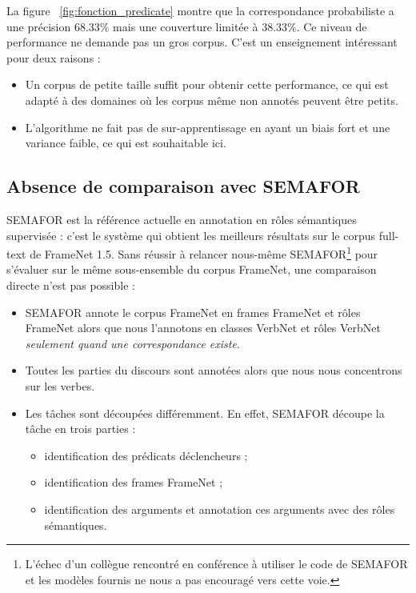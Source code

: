 La figure ~\ref{fig:fonction_predicate} montre que la correspondance
probabiliste a une précision 68.33\% mais une couverture limitée à 38.33\%. Ce
niveau de performance ne demande pas un gros corpus. C'est un enseignement
intéressant pour deux raisons :

\begin{itemize}

    \item Un corpus de petite taille suffit pour obtenir cette performance, ce
    qui est adapté à des domaines où les corpus même non annotés peuvent être
    petits.

    \item L'algorithme ne fait pas de sur-apprentissage en ayant un biais fort
    et une variance faible, ce qui est souhaitable ici.

\end{itemize}

\fi

\subsection{Absence de comparaison avec SEMAFOR}

SEMAFOR \citep{das2014frame} est la référence actuelle en annotation en rôles
sémantiques supervisée : c'est le système qui obtient les meilleurs résultats
sur le corpus full-text de FrameNet 1.5. Sans réussir à relancer nous-même
SEMAFOR\footnote{L'échec d'un collègue rencontré en conférence à utiliser le
code de SEMAFOR et les modèles fournis ne nous a pas encouragé vers cette
voie.} pour s'évaluer sur le même sous-ensemble du corpus FrameNet, une
comparaison directe n'est pas possible :

\begin{itemize}
    \item SEMAFOR annote le corpus FrameNet en frames FrameNet et rôles
        FrameNet alors que nous l'annotons en classes VerbNet et rôles VerbNet
        \textit{seulement quand une correspondance existe}.
    \item Toutes les parties du discours sont annotées alors que nous nous
concentrons sur les verbes.
    \item Les tâches sont découpées différemment. En effet, SEMAFOR découpe la
        tâche en trois parties :
    \begin{itemize}
        \item identification des prédicats déclencheurs ;
        \item identification des frames FrameNet ;
        \item identification des arguments et annotation ces arguments avec des
            rôles sémantiques.
    \end{itemize}
\end{itemize}

